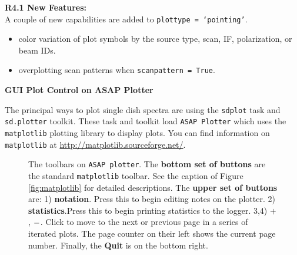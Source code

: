\medskip  
{\bf R4.1 New Features:}\\
A couple of new capabilities are added to {\tt plottype = \lq pointing\rq}.
\begin{itemize}
\item color variation of plot symbols by the source type, scan, IF, polarization, or beam IDs.
\item overplotting scan patterns when {\tt scanpattern = True}.
\end{itemize}




\bigskip
{\bf GUI Plot Control on ASAP Plotter}

The principal ways to plot single dish spectra are using 
the {\tt sdplot} task and {\tt sd.plotter} toolkit. 
These task and toolkit load {\tt ASAP Plotter} which uses 
the {\tt matplotlib} plotting library to display plots. 
You can find information on {\tt matplotlib} at
\url{http://matplotlib.sourceforge.net/}.

\begin{figure}[h!]
\begin{center}
\caption{\label{fig:sdplot_toolbar}
  The toolbars on {\tt ASAP plotter}.
  The {\bf bottom set of buttons} are the standard {\tt matplotlib} toolbar. 
  See the caption of Figure \ref{fig:matplotlib} for detailed descriptions.
  The {\bf upper set of buttons} are:
  1) {\bf notation}. Press this to begin editing notes on the plotter. 
  2) {\bf statistics}.Press this to begin printing statistics to the logger.
  3,4) $ {\bf +} $, $ {\bf -} $. Click to move to the next or previous page in a series 
  of iterated plots. The page counter on their left shows the current page 
  number. Finally, the {\bf Quit} is on the bottom right.}
\hrulefill
\end{center}
\end{figure}

